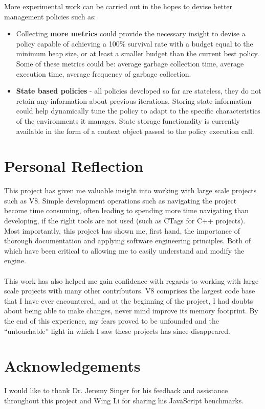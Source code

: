 \documentclass{l4proj}
\begin{document}
More experimental work can be carried out in the hopes to devise better management policies such as:
\begin{itemize}
\item Collecting \textbf{more metrics} could provide the necessary insight to devise a policy capable of achieving a 100\% survival rate with a budget equal to the minimum heap size, or at least a smaller budget than the current best policy. Some of these metrics could be: average garbage collection time, average execution time, average frequency of garbage collection.
\item \textbf{State based policies} - all policies developed so far are stateless, they do not retain any information about previous iterations. Storing state information could help dynamically tune the policy to adapt to the specific characteristics of the environments it manages. State storage functionality is currently available in the form of a context object passed to the policy execution call.  
\end{itemize}

\section{Personal Reflection}
\hspace*{1.5em} This project has given me valuable insight into working with large scale projects such as V8. Simple development operations such as navigating the project become time consuming, often leading to spending more time navigating than developing, if the right tools are not used (such as CTags for C++ projects). Most importantly, this project has shown me, first hand, the importance of thorough documentation and applying software engineering principles. Both of which have been critical to allowing me to easily understand and modify the engine.
\\\\
\hspace*{1.5em} This work has also helped me gain confidence with regards to working with large scale projects with many other contributors. V8 comprises the largest code base that I have ever encountered, and at the beginning of the project, I had doubts about being able to make changes, never mind improve its memory footprint. By the end of this experience, my fears proved to be unfounded and the ``untouchable'' light in which I saw these projects has since disappeared. 

\section{Acknowledgements}
I would like to thank Dr. Jeremy Singer for his feedback and assistance throughout this project and Wing Li for sharing his JavaScript benchmarks.
\end{document}
